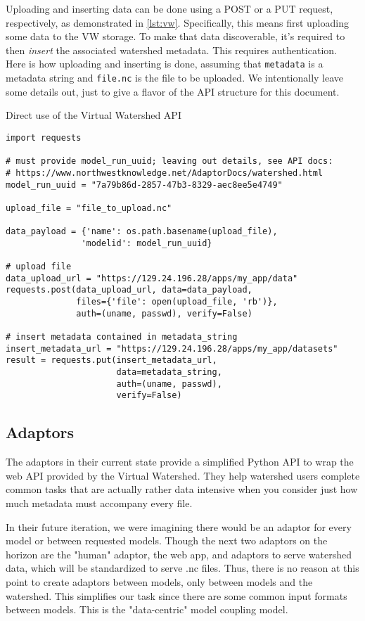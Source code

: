 \documentclass[
11pt, %
a4paper, %
oneside, %
twoside, %
headinclude,footinclude, %
BCOR5mm, %
]{scrartcl}
\begin{document}
Uploading and inserting data can be done using a POST or a PUT request, respectively, as
demonstrated in \ref{lst:vw}. Specifically,
this means first uploading some data to the VW storage. To make that data discoverable, 
it's required to then \textit{insert} the associated watershed metadata. This
requires authentication. Here is how uploading and inserting is done, assuming that \texttt{metadata} is a 
metadata string and \texttt{file.nc} is the file to be uploaded. We intentionally leave some details out,
just to give a flavor of the API structure for this document.
\begin{listing}
    \caption{Direct use of the Virtual Watershed API}
\begin{verbatim}
import requests

# must provide model_run_uuid; leaving out details, see API docs:
# https://www.northwestknowledge.net/AdaptorDocs/watershed.html
model_run_uuid = "7a79b86d-2857-47b3-8329-aec8ee5e4749"

upload_file = "file_to_upload.nc"

data_payload = {'name': os.path.basename(upload_file),
               'modelid': model_run_uuid}

# upload file               
data_upload_url = "https://129.24.196.28/apps/my_app/data"
requests.post(data_upload_url, data=data_payload,
              files={'file': open(upload_file, 'rb')},
              auth=(uname, passwd), verify=False)

# insert metadata contained in metadata_string
insert_metadata_url = "https://129.24.196.28/apps/my_app/datasets"
result = requests.put(insert_metadata_url,
                      data=metadata_string,
                      auth=(uname, passwd),
                      verify=False)
\end{verbatim}
\label{lst:vw}
\end{listing}

\subsection{Adaptors} %
\label{sub:adaptors}

The adaptors in their current state provide a simplified Python API to wrap the web API provided
by the Virtual Watershed. They help watershed users complete common tasks that are actually rather
data intensive when you consider just how much metadata must accompany every file.

In their future iteration, we were imagining there would be an adaptor for every model or between
requested models. Though the next two adaptors on the horizon are the "human" adaptor, the web app, 
and adaptors to serve watershed data, which will be standardized to serve .nc files. Thus, there is
no reason at this point to create adaptors between models, only between models and the watershed.
This simplifies our task since there are some common input formats between models. This is 
the "data-centric" model coupling model.
\end{document}
